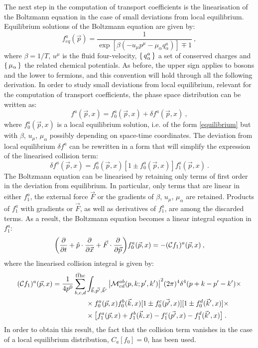 The next step in the computation of transport coefficients is the linearisation of the Boltzmann equation in the case of small deviations from local equilibrium. Equilibrium solutions of the Boltzmann equation are given by:
\begin{equation}
f^a_{eq}(\vec p) = \frac{1}{\exp[\beta(- u_{\mu}p^{\mu} - \mu_{\alpha}q_{\alpha}^a)] \mp 1} \: ,
\label{equilibrium}
\end{equation}
%
where $\beta = 1/T$, $u^{\mu}$ is the fluid four-velocity, $\set{q^a_{\alpha}}$ a set of conserved charges and $\set{\mu_{\alpha}}$ the related chemical potentials. As before, the upper sign applies to bosons and the lower to fermions, and this convention will hold through all the following derivation. In order to study small deviations from local equilibrium, relevant for the computation of transport coefficients, the phase space distribution can be written as:
\begin{equation}
f^a(\vec p, x) = f_0^a(\vec p, x) + \delta f^a (\vec p, x) \: ,
\end{equation}
%
where $f_0^a(\vec p, x)$ is a local equilibrium solution, i.e. of the form \ref{equilibrium} but with $\beta$, $u_{\mu}$, $\mu_{\alpha}$ possibly depending on space-time coordinates. The deviation from local equilibrium $\delta f^a$ can be rewritten in a form that will simplify the expression of the linearised collision term:
\begin{equation}
 \delta f^a (\vec p, x)= f_0^a(\vec p, x) [1 \pm f_0^a(\vec p, x)] f_1^a(\vec p, x) \: .
\end{equation}
%
The Boltzmann equation can be linearised by retaining only terms of first order in the deviation from equilibrium. In particular, only terms that are linear in either $f^a_1$, the external force $\vec F$ or the gradients of $\beta$, $u_{\mu}$, $\mu_{\alpha}$ are retained. Products of $f^a_1$ with gradients or $\vec F$, as well as derivatives of $f^a_1$, are among the discarded terms. As a result, the Boltzmann equation becomes a linear integral equation in $f^a_1$:
\begin{equation}
\biggl( \frac{\partial  }{\partial t}+ \hat p \cdot \frac{\partial  }{\partial \vec x} + \vec F \cdot \frac{\partial  }{\partial \vec p} \biggr) f^a_0(\vec p,x)  =
- (\mathcal Cf_1)^a (\vec p, x) \: ,
\label{lin_boltzmann}
\end{equation}
%
where the linearised collision integral is given by:
\begin{equation}
\begin{split}
(\mathcal Cf_1)^a (\vec p, x) =  \frac{1}{4 p^0} \sum_{b,c,d}^{\mathrm{f \bar f h c}} &\int_{\vec k, \vec{p'}, \vec k'}  \abs{\mathcal M^{ab}_{cd}(p,k;p',k')}^2 (2 \pi)^4 \delta^4(p+k-p'-k') \times \\
&\times f_0^a(\vec p,x) f_0^b(\vec k,x)[1 \pm f_0^c(\vec{p'},x)][1 \pm f_0^d(\vec k', x)] \times \\
& \times \bigl[f_1^a(\vec p,x) + f_1^b(\vec k,x) - f_1^c(\vec{p'},x) - f_1^d(\vec k',x)\bigr] \: .
\end{split}
\label{lin_coll_integral}
\end{equation}
%
In order to obtain this result, the fact that the collision term vanishes in the case of a local equilibrium distribution, $C_a[f_0] = 0$, has been used.

